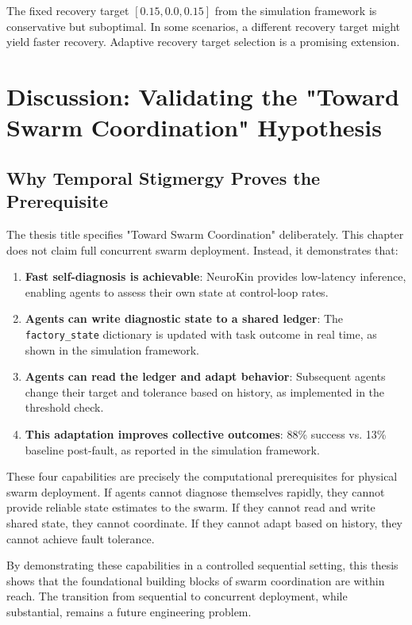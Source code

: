 \documentclass[12pt,a4paper,oneside]{report}
\begin{document}
The fixed recovery target $[0.15, 0.0, 0.15]$ from the simulation framework is conservative but suboptimal. In some scenarios, a different recovery target might yield faster recovery. Adaptive recovery target selection is a promising extension.

\section{Discussion: Validating the "Toward Swarm Coordination" Hypothesis}

\subsection{Why Temporal Stigmergy Proves the Prerequisite}
\label{subsec:why_temporal_stigmergy_proves_the_prerequisite}

The thesis title specifies "Toward Swarm Coordination" deliberately. This chapter does not claim full concurrent swarm deployment. Instead, it demonstrates that:

\begin{enumerate}
    \item \textbf{Fast self-diagnosis is achievable}: NeuroKin provides low-latency inference, enabling agents to assess their own state at control-loop rates.
    \item \textbf{Agents can write diagnostic state to a shared ledger}: The \texttt{factory\_state} dictionary is updated with task outcome in real time, as shown in the simulation framework.
    \item \textbf{Agents can read the ledger and adapt behavior}: Subsequent agents change their target and tolerance based on history, as implemented in the threshold check.
    \item \textbf{This adaptation improves collective outcomes}: 88\% success vs. 13\% baseline post-fault, as reported in the simulation framework.
\end{enumerate}

These four capabilities are precisely the computational prerequisites for physical swarm deployment. If agents cannot diagnose themselves rapidly, they cannot provide reliable state estimates to the swarm. If they cannot read and write shared state, they cannot coordinate. If they cannot adapt based on history, they cannot achieve fault tolerance.

By demonstrating these capabilities in a controlled sequential setting, this thesis shows that the foundational building blocks of swarm coordination are within reach. The transition from sequential to concurrent deployment, while substantial, remains a future engineering problem.
\end{document}
